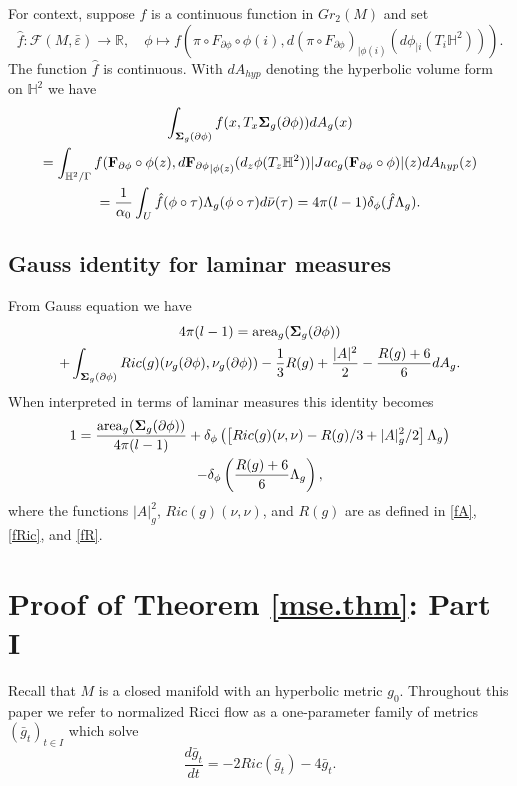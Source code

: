 \documentclass[11pt]{amsart}
\def\R{\mathbb R}
\def\H{\mathbb H}
\theoremstyle{remark}
\theoremstyle{definition}
\begin{document}
{{	
	For context, suppose $f$ is a continuous function in $Gr_2(M)$ and set
	$$\hat f:\mathcal F(M,\bar\varepsilon)\rightarrow \R,\quad \phi\mapsto f({\pi\circ F_{\partial \phi}}\circ\phi(i),d({\pi\circ F_{\partial \phi}})_{|\phi(i)}(d\phi_{|i}({T_i}\H^2))).$$
	The function $\hat f$ is continuous. With $dA_{hyp}$ denoting the hyperbolic volume form on $\H^2$ we have
	\begin{multline}%
		\int_{{\bf \Sigma}_{g}(\partial \phi)}f(x,T_x{\bf \Sigma}_{g}(\partial \phi))dA_g(x)\\
		=\int_{\H^2/ \Gamma} f({\bf F_{\partial \phi}}\circ\phi(z),d{\bf F_{\partial \phi}}_{|\phi(z)}(d_z\phi({T_z}\H^2))|Jac_g ({\bf F_{\partial \phi}\circ \phi})|(z)dA_{hyp}(z)\\
		=\frac{1}{\alpha_0}\int_U\hat f(\phi\circ \tau)\Lambda_g(\phi\circ \tau) d\bar \nu(\tau)=4\pi(l-1)\delta_{\phi}(\hat f \Lambda_g).
	\end{multline}
	
	\subsection*{Gauss identity for laminar measures}
	From Gauss equation we have 
	\begin{multline*}
		4\pi(l-1)=\text{area}_g({\bf \Sigma}_{g}(\partial \phi))\\
		+\int_{{\bf \Sigma}_{g}(\partial \phi)}Ric(g)({\nu}_g({\partial\phi}),{\nu}_g({\partial\phi})) -\frac{1}{3}R(g)+\frac{|A|^2}{2}-\frac{R(g)+6}{6}dA_g.
	\end{multline*}
	{When interpreted in terms of laminar measures this identity becomes}
	\begin{multline}\label{identity}
		1=\frac{\text{area}_g({\bf \Sigma}_{g}(\partial \phi))}{4\pi(l-1)}+\delta_{\phi}\left(\left[Ric(g)(\nu,\nu)-{R(g)/3}+{|A|^2_g}/{2}\right]\Lambda_g\right)\\
		-\delta_{\phi}\left(\frac{R(g)+6}{6}\Lambda_g\right),
	\end{multline}
	where the functions $|A|^2_g$, $Ric(g)(\nu,\nu)$, and $R(g)$ are as defined in \eqref{fA}, \eqref{fRic}, and \eqref{fR}.  
	
	
	
	\section{Proof of Theorem \ref{mse.thm}: Part I}
	
	
	
	Recall that $M$ is a closed manifold with an hyperbolic metric $g_0$. Throughout  this paper we refer to normalized Ricci flow as a  one-parameter family of metrics $(\bar g_t)_{t\in I}$ which solve
	\begin{equation}\label{RF}
		\frac{d\bar g_t}{dt}=-2Ric(\bar g_t)-4\bar g_t.
	\end{equation}
	
}}
\end{document}
